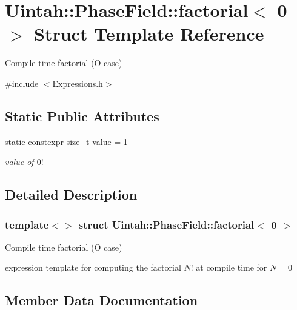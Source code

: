 \hypertarget{structUintah_1_1PhaseField_1_1factorial_3_010_01_4}{}\section{Uintah\+:\+:Phase\+Field\+:\+:factorial$<$ 0 $>$ Struct Template Reference}
\label{structUintah_1_1PhaseField_1_1factorial_3_010_01_4}


Compile time factorial (O case)  




{\ttfamily \#include $<$Expressions.\+h$>$}

\subsection*{Static Public Attributes}
\begin{DoxyCompactItemize}
\item 
static constexpr size\+\_\+t \hyperlink{structUintah_1_1PhaseField_1_1factorial_3_010_01_4_a2bcaf97a9b7b81ab1a6fc2891ddaa3da}{value} = 1
\begin{DoxyCompactList}\small\item\em value of $ 0! $ \end{DoxyCompactList}\end{DoxyCompactItemize}


\subsection{Detailed Description}
\subsubsection*{template$<$$>$\newline
struct Uintah\+::\+Phase\+Field\+::factorial$<$ 0 $>$}

Compile time factorial (O case) 

expression template for computing the factorial $ N! $ at compile time for $ N=0 $ 

\subsection{Member Data Documentation}
\mbox{\label{structUintah_1_1PhaseField_1_1factorial_3_010_01_4_a2bcaf97a9b7b81ab1a6fc2891ddaa3da}} 
